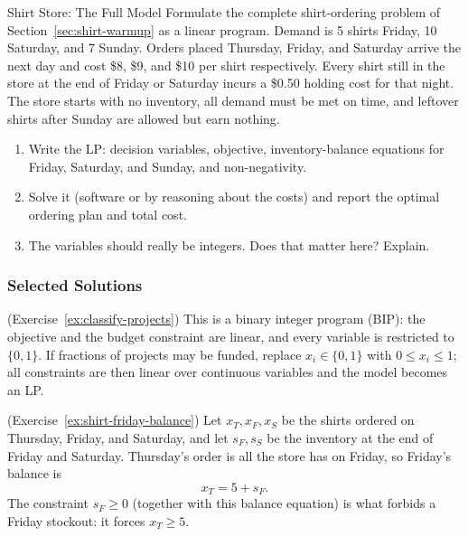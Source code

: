 \begin{ex}{Shirt Store: The Full Model}{}
\label{ex:shirt-full-lp}
 Formulate the complete shirt-ordering problem of Section~\ref{sec:shirt-warmup} as a linear program.  Demand is 5 shirts Friday, 10 Saturday, and 7 Sunday.  Orders placed Thursday, Friday, and Saturday arrive the next day and cost \$8, \$9, and \$10 per shirt respectively.  Every shirt still in the store at the end of Friday or Saturday incurs a \$0.50 holding cost for that night.  The store starts with no inventory, all demand must be met on time, and leftover shirts after Sunday are allowed but earn nothing.
\begin{enumerate}
\item Write the LP: decision variables, objective, inventory-balance equations for Friday, Saturday, and Sunday, and non-negativity.
\item Solve it (software or by reasoning about the costs) and report the optimal ordering plan and total cost.
\item The variables should really be integers.  Does that matter here?  Explain.
\end{enumerate}
\end{ex}

\subsubsection*{Selected Solutions}

\begin{solution}(Exercise~\ref{ex:classify-projects})
This is a binary integer program (BIP): the objective and the budget constraint are linear, and every variable is restricted to $\{0,1\}$.  If fractions of projects may be funded, replace $x_i \in \{0,1\}$ with $0 \leq x_i \leq 1$; all constraints are then linear over continuous variables and the model becomes an LP.
\end{solution}

\begin{solution}(Exercise~\ref{ex:shirt-friday-balance})
Let $x_T, x_F, x_S$ be the shirts ordered on Thursday, Friday, and Saturday, and let $s_F, s_S$ be the inventory at the end of Friday and Saturday.  Thursday's order is all the store has on Friday, so Friday's balance is
\[
x_T = 5 + s_F .
\]
The constraint $s_F \geq 0$ (together with this balance equation) is what forbids a Friday stockout: it forces $x_T \geq 5$.
\end{solution}

